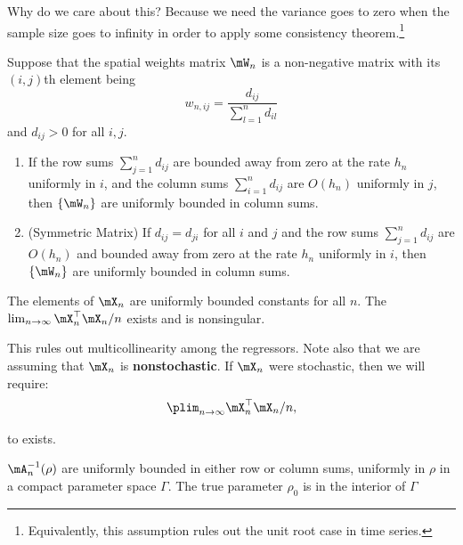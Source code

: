 Why do we care about this? Because we need the variance goes to zero when the sample size goes to infinity in order to apply some consistency theorem.\footnote{Equivalently, this assumption rules out the unit root case in time series.}

\begin{lemma}
  Suppose that the spatial weights matrix $\mW_n$ is a non-negative matrix with its $(i,j)$th element being 
  \begin{equation*}
    w_{n,ij} = \frac{d_{ij}}{\sum_{l = 1}^nd_{il}}
  \end{equation*}
  and $d_{ij}>0$ for all $i,j$.
  
  \begin{enumerate}
    \item If the row sums $\sum_{j = 1}^nd_{ij}$ are bounded away from zero at the rate $h_n$ uniformly in $i$, and the column sums $\sum_{i = 1}^nd_{ij}$ are $O(h_n)$ uniformly in $j$, then $\left\lbrace \mW_n \right\rbrace$  are uniformly bounded in column sums.
    \item (Symmetric Matrix) If $d_{ij} = d_{ji}$ for all $i$ and $j$ and the row sums $\sum_{j = 1}^nd_{ij}$ are $O(h_n)$ and bounded away from zero at the rate $h_n$ uniformly in $i$, then $\left\lbrace \mW_n \right\rbrace$  are uniformly bounded in column sums.
  \end{enumerate}
\end{lemma}

\begin{assumption}\label{assu:ml_6}
	The elements of $\mX_n$ are uniformly bounded constants for all $n$. The $\lim_{n\to \infty}\mX_n^\top\mX_n/n$ exists and is nonsingular. 
\end{assumption}

This rules out multicollinearity among the regressors. Note also that we are assuming that $\mX_n$ is \textbf{nonstochastic}. If $\mX_n$ were stochastic, then we will require:
\begin{equation*}
  \plim_{n\to \infty}\mX_n^\top\mX_n/ n,
\end{equation*}

to exists.

\begin{assumption}\label{assu:ml_7}
	${\mA_n^{-1}(\rho)}$ are uniformly bounded in either row or column sums, uniformly in $\rho$ in a compact parameter space $\Gamma$. The true parameter $\rho_0$ is in the interior of $\Gamma$
\end{assumption}

